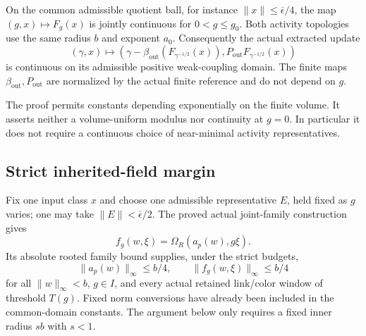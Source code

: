 \begin{theorem}
\label{fqc-theorem}
On the common admissible quotient ball, for instance
$\lVert x\rVert\leq\overline\epsilon/4$, the map
$(g,x)\mapsto F_g(x)$ is jointly continuous for $0<g\leq g_0$.
Both activity topologies use the same radius $b$ and exponent $a_0$.
Consequently the actual extracted update
\begin{equation}
 (\gamma,x)\longmapsto
 \left(\gamma-\beta_{\mathrm{out}}
                 (F_{\gamma^{-1/2}}(x)),
       P_{\mathrm{out}}F_{\gamma^{-1/2}}(x)\right)
 \label{fqc-extracted-map}
\end{equation}
is continuous on its admissible positive weak-coupling domain.
The finite maps $\beta_{\mathrm{out}},P_{\mathrm{out}}$ are normalized
by the actual finite reference and do not depend on $g$.
\end{theorem}

The proof permits constants depending exponentially on the finite
volume. It asserts neither a volume-uniform modulus nor continuity
at $g=0$. In particular it does not require a continuous choice of
near-minimal activity representatives.

\subsection{Strict inherited-field margin}
\label{fqc-margin-section}

Fix one input class $x$ and choose one admissible representative
$E$, held fixed as $g$ varies; one may take
$\lVert E\rVert<\overline\epsilon/2$.
The proved actual joint-family construction gives
\begin{equation}
 f_g(w,\xi)=\Omega_R(a_p(w),g\xi).
 \label{fqc-actual-field}
\end{equation}
Its absolute rooted family bound supplies, under the strict budgets,
\begin{equation}
 \lVert a_p(w)\rVert_\infty\leq b/4,\qquad
 \lVert f_g(w,\xi)\rVert_\infty\leq b/4
 \label{fqc-margin}
\end{equation}
for all $\lVert w\rVert_\infty<b$, $g\in I$, and every actual
retained link/color window of threshold $T(g)$. Fixed norm
conversions have already been included in the common-domain
constants. The argument below only requires a fixed inner radius
$sb$ with $s<1$.

